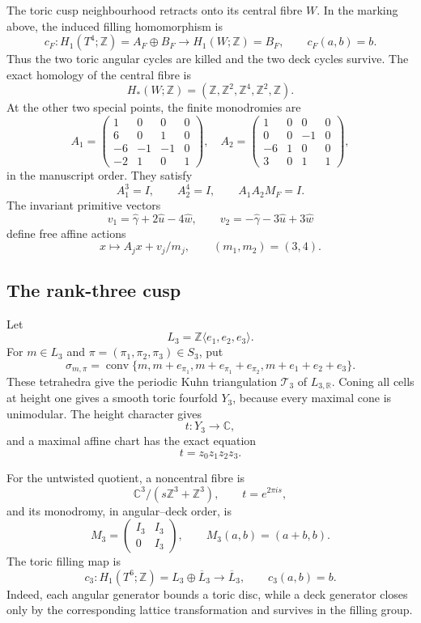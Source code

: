 The toric cusp neighbourhood retracts onto its central fibre \(W\).  In the
marking above, the induced filling homomorphism is
\[
 c_F:H_1(T^4;\mathbb Z)=A_F\oplus B_F\longrightarrow H_1(W;\mathbb Z)=B_F,
 \qquad c_F(a,b)=b.
 \tag{TEB.5}
\]
Thus the two toric angular cycles are killed and the two deck cycles survive.
The exact homology of the central fibre is
\[
 H_*(W;\mathbb Z)=
 (\mathbb Z,\mathbb Z^2,\mathbb Z^4,\mathbb Z^2,\mathbb Z).
 \tag{TEB.6}
\]
At the other two special points, the finite monodromies are
\[
 A_1=
 \begin{pmatrix}
 1&0&0&0\\6&0&1&0\\-6&-1&-1&0\\-2&1&0&1
 \end{pmatrix},
 \quad
 A_2=
 \begin{pmatrix}
 1&0&0&0\\0&0&-1&0\\-6&1&0&0\\3&0&1&1
 \end{pmatrix},
 \tag{TEB.7}
\]
in the manuscript order.  They satisfy
\[
 A_1^3=I,\qquad A_2^4=I,\qquad A_1A_2M_F=I.
 \tag{TEB.8}
\]
The invariant primitive vectors
\[
 v_1=\widehat\gamma+2\widehat u-4\widehat w,
 \qquad
 v_2=-\widehat\gamma-3\widehat u+3\widehat w
 \tag{TEB.9}
\]
define free affine actions
\[
 x\longmapsto A_jx+v_j/m_j,
 \qquad (m_1,m_2)=(3,4).
 \tag{TEB.10}
\]

\subsection{The rank-three cusp}
\label{subsec:teb-rank-three}

Let
\[
 L_3=\mathbb Z\langle e_1,e_2,e_3\rangle.
\]
For \(m\in L_3\) and \(\pi=(\pi_1,\pi_2,\pi_3)\in S_3\), put
\[
 \sigma_{m,\pi}=\operatorname{conv}\{m,
 m+e_{\pi_1},m+e_{\pi_1}+e_{\pi_2},m+e_1+e_2+e_3\}.
 \tag{TEB.11}
\]
These tetrahedra give the periodic Kuhn triangulation \(\mathcal T_3\) of
\(L_{3,\mathbb R}\).  Coning all cells at height one gives a smooth toric
fourfold \(Y_3\), because every maximal cone is unimodular.  The height
character gives
\[
 t:Y_3\longrightarrow\mathbb C,
\]
and a maximal affine chart has the exact equation
\[
 t=z_0z_1z_2z_3.
 \tag{TEB.12}
\]

For the untwisted quotient, a noncentral fibre is
\[
 \mathbb C^3/(s\mathbb Z^3+\mathbb Z^3),
 \qquad t=e^{2\pi i s},
\]
and its monodromy, in angular--deck order, is
\[
 M_3=\begin{pmatrix}I_3&I_3\\0&I_3\end{pmatrix},
 \qquad M_3(a,b)=(a+b,b).
 \tag{TEB.13}
\]
The toric filling map is
\[
 c_3:H_1(T^6;\mathbb Z)=L_3\oplus\overline L_3
 \longrightarrow\overline L_3,
 \qquad c_3(a,b)=b.                                    \tag{TEB.14}
\]
Indeed, each angular generator bounds a toric disc, while a deck generator
closes only by the corresponding lattice transformation and survives in the
filling group.

